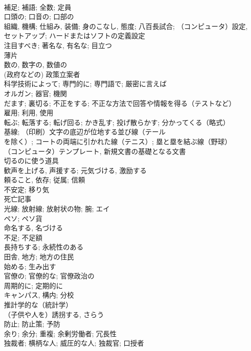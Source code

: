\documentclass[8pt]{extreport}
\begin{document}
\begin{CJK}{UTF8}{min}
\\	補足; 補語; 全数; 定員	
\\	口頭の; 口音の; 口部の	
\\	組織, 機構; 仕組み, 装備; 身のこなし, 態度; 八百長試合; （コンピュータ）設定, セットアップ; ハードまたはソフトの定義設定	
\\	注目すべき; 著名な, 有名な; 目立つ	
\\	薄片	
\\	数の, 数字の, 数値の	
\\	(政府などの) 政策立案者	
\\	科学技術によって; 専門的に; 専門語で; 厳密に言えば	
\\	オルガン; 器官; 機関	
\\	だます; 裏切る; 不正をする; 不正な方法で回答や情報を得る（テストなど）	
\\	雇用; 利用, 使用	
\\	転ぶ; 転落する; 転げ回る; かき乱す; 投げ散らかす; 分かってくる（略式）	
\\	基線; （印刷）文字の底辺が位地する並び線（テール 
\\	を除く）; コートの両端に引かれた線（テニス）; 塁と塁を結ぶ線（野球）	
\\	（コンピュータ）テンプレート, 新規文書の基礎となる文書 
\\	切るのに使う道具	
\\	歓声を上げる, 声援する; 元気づける, 激励する	
\\	頼ること, 依存; 従属; 信頼	
\\	不安定; 移り気	
\\	死亡記事
\\	光線; 放射線; 放射状の物; 腕; エイ	
\\	ペソ; ペソ貨	
\\	命名する, 名づける	
\\	不足; 不足額	
\\	長持ちする; 永続性のある	
\\	田舎, 地方; 地方の住民	
\\	始める; 生み出す	
\\	官僚の; 官僚的な; 官僚政治の	
\\	周期的に; 定期的に
\\	キャンパス, 構内; 分校	
\\	推計学的な（統計学）	
\\	（子供や人を）誘拐する, さらう	
\\	防止; 防止策; 予防	
\\	余り; 余分; 重複; 余剰労働者; 冗長性	
\\	独裁者; 横柄な人; 威圧的な人; 独裁官; 口授者	

\end{CJK}
\end{document}
